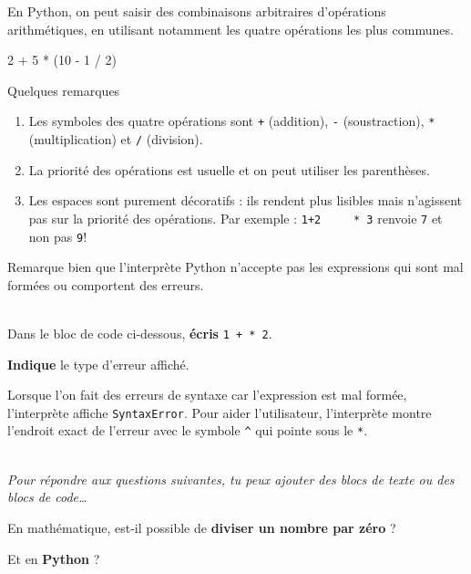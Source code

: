 \documentclass[a4paper,17pt]{extarticle}
\newenvironment{eleve}%
{\begin{activite}\color{noiramu}\\[-0.5cm]}
{\end{activite}}
\providecommand{\tightlist}{%
      \setlength{\itemsep}{0pt}\setlength{\parskip}{0pt}}
\newenvironment{Shaded}{}{}
\newcommand{\DecValTok}[1]{\textcolor[rgb]{0.25,0.63,0.44}{{#1}}}
\newcommand{\NormalTok}[1]{{#1}}
\newcommand{\OperatorTok}[1]{\textcolor[rgb]{0.40,0.40,0.40}{{#1}}}
\begin{document}
    En Python, on peut saisir des combinaisons arbitraires d'opérations
arithmétiques, en utilisant notamment les quatre opérations les plus
communes.
\begin{exemple}
    \begin{Shaded}
\begin{Highlighting}[]
\DecValTok{2} \OperatorTok{+} \DecValTok{5} \OperatorTok{*}\NormalTok{ (}\DecValTok{10} \OperatorTok{{-}} \DecValTok{1} \OperatorTok{/} \DecValTok{2}\NormalTok{)}
\end{Highlighting}
\end{Shaded}

        \end{exemple}\begin{remarque}
    Quelques remarques

\begin{enumerate}
\def\labelenumi{\arabic{enumi}.}
\tightlist
\item
  Les symboles des quatre opérations sont \texttt{+} (addition),
  \texttt{-} (soustraction), \texttt{*} (multiplication) et \texttt{/}
  (division).
\item
  La priorité des opérations est usuelle et on peut utiliser les
  parenthèses.
\item
  Les espaces sont purement décoratifs : ils rendent plus lisibles mais
  n'agissent pas sur la priorité des opérations. Par exemple :
  \texttt{1+2\ \ \ \ \ *\ 3} renvoie \texttt{7} et non pas \texttt{9}!
\end{enumerate}

        \end{remarque}
    Remarque bien que l'interprète Python n'accepte pas les expressions qui
sont mal formées ou comportent des erreurs.
\begin{eleve}
    Dans le bloc de code ci-dessous, \textbf{écris} \texttt{1\ +\ *\ 2}.

\textbf{Indique} le type d'erreur affiché.
        
        \end{eleve}\begin{reponse}
    Lorsque l'on fait des erreurs de syntaxe car l'expression est mal
formée, l'interprète affiche \texttt{SyntaxError}. Pour aider
l'utilisateur, l'interprète montre l'endroit exact de l'erreur avec le
symbole \texttt{\^{}} qui pointe sous le \texttt{*}.

        \end{reponse}\begin{eleve}
    \emph{Pour répondre aux questions suivantes, tu peux ajouter des blocs
de texte ou des blocs de code\ldots{}}

En mathématique, est-il possible de \textbf{diviser un nombre par zéro}
?

Et en \textbf{Python} ?
        
        \end{eleve}
\end{document}
